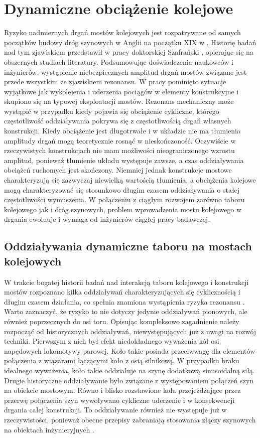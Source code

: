 \section{Dynamiczne obciążenie kolejowe}
Ryzyko nadmiernych drgań mostów kolejowych jest rozpatrywane od samych początków budowy dróg szynowych w Anglii na początku XIX w \parencite{Ladislav1996}. Historię badań nad tym zjawiskiem przedstawił w pracy doktorskiej Szafrański \cite{Szafranski2013}, opierając się na obszernych studiach literatury. Podsumowując doświadczenia naukowców i inżynierów, wystąpienie niebezpiecznych amplitud drgań mostów związane jest przede wszystkim ze zjawiskiem rezonansu. W pracy pominięto sytuacje wyjątkowe jak wykolejenia i uderzenia pociągów w elementy konstrukcyjne i skupiono się na typowej eksploatacji mostów. Rezonans mechaniczny może wystąpić w przypadku kiedy pojawia się obciążenie cykliczne, którego częstotliwość oddziaływania pokrywa się z częstotliwością drgań własnych konstrukcji. Kiedy obciążenie jest długotrwałe i w układzie nie ma tłumienia amplitudy drgań mogą teoretycznie rosnąć w nieskończoność. Oczywiście w rzeczywistych konstrukcjach nie mam możliwości nieograniczonego wzrostu amplitud, ponieważ tłumienie układu występuje zawsze, a czas oddziaływania obciążeń ruchomych jest skończony. Niemniej jednak konstrukcje mostowe charakteryzują się zazwyczaj niewielką wartością tłumienia, a obciążenia kolejowe mogą charakteryzować się stosunkowo długim czasem oddziaływania o stałej częstotliwości wymuszenia. W połączeniu z ciągłym rozwojem zarówno taboru kolejowego jak i dróg szynowych, problem wprowadzenia mostu kolejowego w drgania ewoluuje i wymaga od inżynierów ciągłej pracy badawczej.


\subsection{Oddziaływania dynamiczne taboru na mostach kolejowych}
W trakcie bogatej historii badań nad interakcją taboru kolejowego i konstrukcji mostów rozpoznano kilka oddziaływań charakteryzujących się cyklicznością i długim czasem działania, co spełnia znamiona wystąpienia ryzyka rezonansu \parencite{Fryba2001}. Warto zaznaczyć, że ryzyko to nie dotyczy jedynie oddziaływań pionowych, ale również poprzecznych do osi toru. Opisując kompleksowo zagadnienie należy rozpocząć od historycznych oddziaływań, niewystępujących już z uwagi na rozwój techniki. Pierwszym z nich był efekt niedokładnego wyważenia kół osi napędowych lokomotywy parowej. Koło takie posiada przeciwwagę dla elementów połączenia z wiązarami łączącymi koło z osią silnikową. W przypadku braku idealnego wyważenia, koło takie oddziałuje na szynę dodatkową sinusoidalną siłą. Drugie historyczne oddziaływanie było związane z występowaniem połączeń szyn na obiekcie mostowym. Równo i blisko rozstawione koła przejeżdżające przez przerwę połączenia szyn wywoływano cykliczne uderzenie i w konsekwencji drgania całej konstrukcji. To oddziaływanie również nie występuje już w rzeczywistości, ponieważ obecne przepisy zabraniają stosowania złączy szynowych na obiektach inżynieryjnych \parencite{PKPPolskieLinieKolejoweS.A.2005}. 

